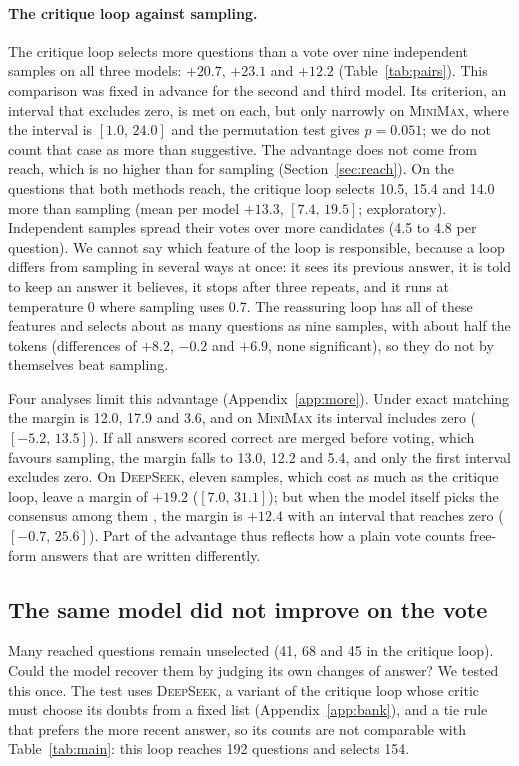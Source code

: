 \documentclass[11pt]{article}
\newcommand{\ds}{\textsc{DeepSeek}}
\newcommand{\mm}{\textsc{MiniMax}}
\newcommand{\ci}[2]{$[#1,\,#2]$}
\begin{document}
\paragraph{The critique loop against sampling.}
The critique loop selects more questions than a vote over nine independent samples on all three models: $+20.7$, $+23.1$ and $+12.2$ (Table~\ref{tab:pairs}).
This comparison was fixed in advance for the second and third model.
Its criterion, an interval that excludes zero, is met on each, but only narrowly on \mm{}, where the interval is \ci{1.0}{24.0} and the permutation test gives $p=0.051$; we do not count that case as more than suggestive.
The advantage does not come from reach, which is no higher than for sampling (Section~\ref{sec:reach}).
On the questions that both methods reach, the critique loop selects 10.5, 15.4 and 14.0 more than sampling (mean per model $+13.3$, \ci{7.4}{19.5}; exploratory).
Independent samples spread their votes over more candidates (4.5 to 4.8 per question).
We cannot say which feature of the loop is responsible, because a loop differs from sampling in several ways at once: it sees its previous answer, it is told to keep an answer it believes, it stops after three repeats, and it runs at temperature 0 where sampling uses 0.7.
The reassuring loop has all of these features and selects about as many questions as nine samples, with about half the tokens (differences of $+8.2$, $-0.2$ and $+6.9$, none significant), so they do not by themselves beat sampling.

Four analyses limit this advantage (Appendix~\ref{app:more}).
Under exact matching the margin is 12.0, 17.9 and 3.6, and on \mm{} its interval includes zero (\ci{-5.2}{13.5}).
If all answers scored correct are merged before voting, which favours sampling, the margin falls to 13.0, 12.2 and 5.4, and only the first interval excludes zero.
On \ds, eleven samples, which cost as much as the critique loop, leave a margin of $+19.2$ (\ci{7.0}{31.1}); but when the model itself picks the consensus among them \citep{chen2023usc}, the margin is $+12.4$ with an interval that reaches zero (\ci{-0.7}{25.6}).
Part of the advantage thus reflects how a plain vote counts free-form answers that are written differently.

\subsection{The same model did not improve on the vote}
\label{sec:judges}

Many reached questions remain unselected (41, 68 and 45 in the critique loop).
Could the model recover them by judging its own changes of answer?
We tested this once.
The test uses \ds, a variant of the critique loop whose critic must choose its doubts from a fixed list (Appendix~\ref{app:bank}), and a tie rule that prefers the more recent answer, so its counts are not comparable with Table~\ref{tab:main}: this loop reaches 192 questions and selects 154.
\end{document}
